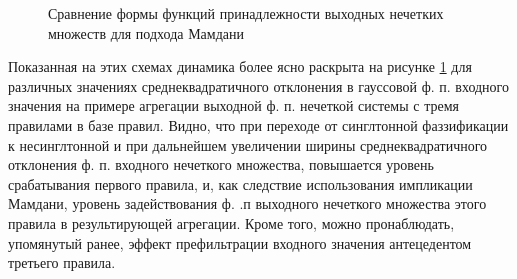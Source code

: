 \begin{figure}[ht]
\begin{subfigure}[b]{\textwidth}
    \end{subfigure}
    \caption{Сравнение формы функций принадлежности выходных нечетких множеств для подхода Мамдани}
    \label{fig:ns-width-influence-to-out-mamdani}
\end{figure}

Показанная на этих схемах динамика более ясно раскрыта на рисунке \cref{fig:ns-width-influence-to-out-mamdani} для различных значениях среднеквадратичного отклонения в гауссовой ф. п. входного значения на примере агрегации выходной ф. п. нечеткой системы с тремя правилами в базе правил. Видно, что при переходе от синглтонной фаззификации к несинглтонной и при дальнейшем увеличении ширины среднеквадратичного отклонения ф. п. входного нечеткого множества, повышается уровень срабатывания первого правила, и, как следствие использования импликации Мамдани, уровень задействования ф. .п выходного нечеткого множества этого правила в результирующей агрегации. Кроме того, можно пронаблюдать, упомянутый ранее, эффект префильтрации входного значения антецедентом третьего правила.



